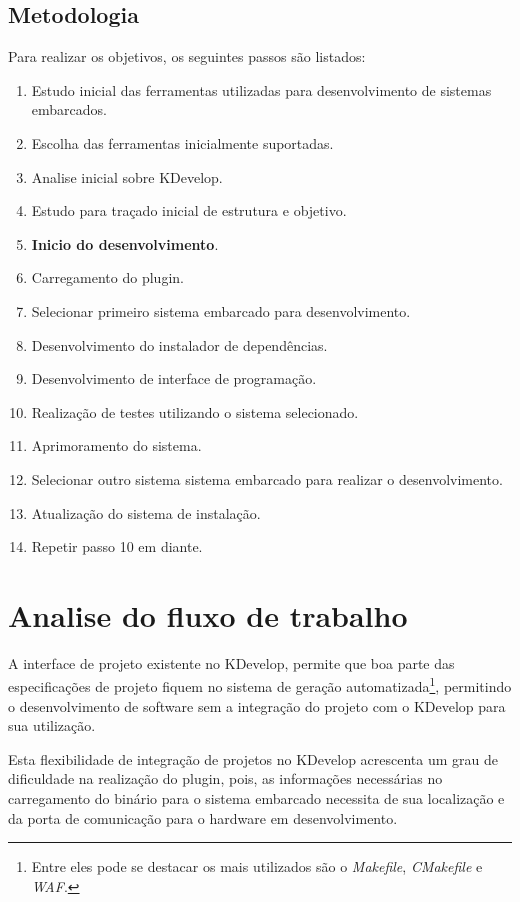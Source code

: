 \subsection{Metodologia}
\label{ss:objetivosespecificos}
Para realizar os objetivos, os seguintes passos são listados:
\begin{enumerate}
\item Estudo inicial das ferramentas utilizadas para desenvolvimento de sistemas embarcados.
\item Escolha das ferramentas inicialmente suportadas.
\item Analise inicial sobre KDevelop.
\item Estudo para traçado inicial de estrutura e objetivo.
\item \textbf{Inicio do desenvolvimento}.
\item Carregamento do plugin.
\item Selecionar primeiro sistema embarcado para desenvolvimento.
\item Desenvolvimento do instalador de dependências.
\item Desenvolvimento de interface de programação.
\item Realização de testes utilizando o sistema selecionado.
\item Aprimoramento do sistema.
\item Selecionar outro sistema sistema embarcado para realizar o desenvolvimento.
\item Atualização do sistema de instalação.
\item Repetir passo 10 em diante.
\end{enumerate}

\section{Analise do fluxo de trabalho}

A interface de projeto existente no KDevelop, permite que boa parte das especificações de projeto fiquem no sistema de geração automatizada\footnote{Entre eles pode se destacar os mais utilizados são o \textit{Makefile}, \textit{CMakefile} e \textit{WAF}.}, permitindo o desenvolvimento de software sem a integração do projeto com o KDevelop para sua utilização.
\iffalse
, utilizando arquivos intermediários de configuração\footnote{Arquivos que contem informações sobre compilador, estilo de código, execução e etc.}.
\fi
Esta flexibilidade de integração de projetos no KDevelop acrescenta um grau de dificuldade na realização do plugin, pois, as informações necessárias no carregamento do binário para o sistema embarcado necessita de sua localização e da porta de comunicação para o hardware em desenvolvimento. %


